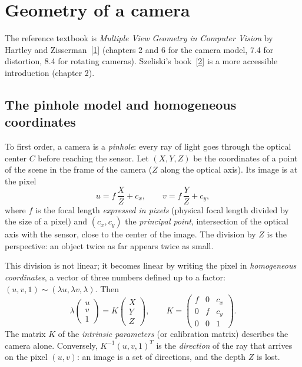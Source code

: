 \documentclass[a4paper,11pt]{report}
\begin{document}
\section{Geometry of a camera}\label{sec:ann_camera}
The reference textbook is \emph{Multiple View Geometry in Computer Vision} by Hartley and Zisserman~[\hyperref[ann_hz]{1}] (chapters 2 and 6 for the camera model, 7.4 for distortion, 8.4 for rotating cameras). Szeliski's book~[\hyperref[ann_szeliski]{2}] is a more accessible introduction (chapter 2).

\subsection{The pinhole model and homogeneous coordinates}
To first order, a camera is a \emph{pinhole}: every ray of light goes through the optical center $C$ before reaching the sensor. Let $(X,Y,Z)$ be the coordinates of a point of the scene in the frame of the camera ($Z$ along the optical axis). Its image is at the pixel
\begin{equation}
	u = f\,\frac{X}{Z} + c_x, \qquad v = f\,\frac{Y}{Z} + c_y,
\end{equation}
where $f$ is the focal length \emph{expressed in pixels} (physical focal length divided by the size of a pixel) and $(c_x, c_y)$ the \emph{principal point}, intersection of the optical axis with the sensor, close to the center of the image. The division by $Z$ is the perspective: an object twice as far appears twice as small.

This division is not linear; it becomes linear by writing the pixel in \emph{homogeneous coordinates}, a vector of three numbers defined up to a factor: $(u, v, 1) \sim (\lambda u, \lambda v, \lambda)$. Then
\begin{equation}\label{eq:ann_pinhole}
	\lambda \begin{pmatrix} u \\ v \\ 1 \end{pmatrix} = K \begin{pmatrix} X \\ Y \\ Z \end{pmatrix},
	\qquad
	K = \begin{pmatrix} f & 0 & c_x \\ 0 & f & c_y \\ 0 & 0 & 1 \end{pmatrix}.
\end{equation}
The matrix $K$ of the \emph{intrinsic parameters} (or calibration matrix) describes the camera alone. Conversely, $K^{-1}(u, v, 1)^T$ is the \emph{direction} of the ray that arrives on the pixel $(u,v)$: an image is a set of directions, and the depth $Z$ is lost.
\end{document}
